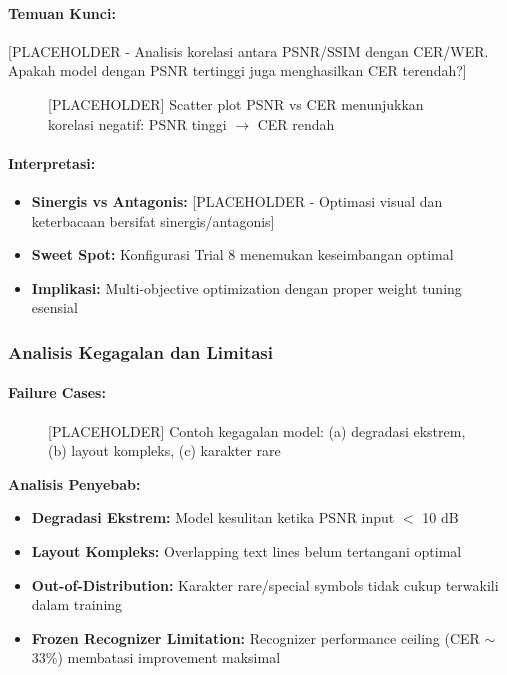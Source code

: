 \documentclass{article}
\begin{document}
\paragraph{Temuan Kunci:}
[PLACEHOLDER - Analisis korelasi antara PSNR/SSIM dengan CER/WER. Apakah model dengan PSNR tertinggi juga menghasilkan CER terendah?]

\begin{figure}[H]
    \centering
    \caption{[PLACEHOLDER] Scatter plot PSNR vs CER menunjukkan korelasi negatif: PSNR tinggi $\rightarrow$ CER rendah}
    \label{fig:tradeoff-analysis}
\end{figure}

\paragraph{Interpretasi:}
\begin{itemize}
    \item \textbf{Sinergis vs Antagonis:} [PLACEHOLDER - Optimasi visual dan keterbacaan bersifat sinergis/antagonis]
    \item \textbf{Sweet Spot:} Konfigurasi Trial 8 menemukan keseimbangan optimal
    \item \textbf{Implikasi:} Multi-objective optimization dengan proper weight tuning esensial
\end{itemize}

\subsubsection{Analisis Kegagalan dan Limitasi}

\paragraph{Failure Cases:}

\begin{figure}[H]
    \centering
    \caption{[PLACEHOLDER] Contoh kegagalan model: (a) degradasi ekstrem, (b) layout kompleks, (c) karakter rare}
    \label{fig:failure-cases}
\end{figure}

\textbf{Analisis Penyebab:}
\begin{itemize}
    \item \textbf{Degradasi Ekstrem:} Model kesulitan ketika PSNR input $<$ 10 dB
    \item \textbf{Layout Kompleks:} Overlapping text lines belum tertangani optimal
    \item \textbf{Out-of-Distribution:} Karakter rare/special symbols tidak cukup terwakili dalam training
    \item \textbf{Frozen Recognizer Limitation:} Recognizer performance ceiling (CER $\sim$33\%) membatasi improvement maksimal
\end{itemize}
\end{document}
